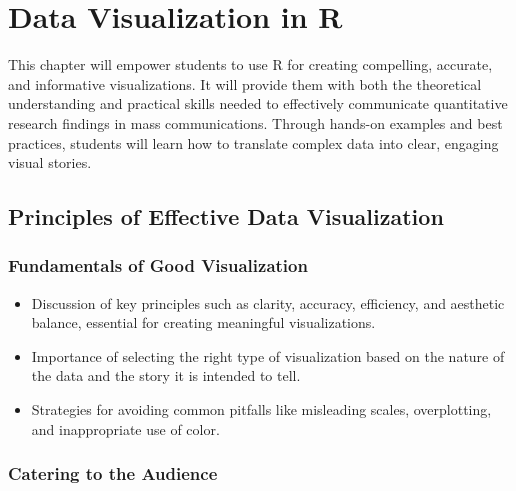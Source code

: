 \documentclass[
]{book}
\begin{document}
\hypertarget{data-visualization-in-r}{%
\chapter*{Data Visualization in R}\label{data-visualization-in-r}}

This chapter will empower students to use R for creating compelling, accurate, and informative visualizations. It will provide them with both the theoretical understanding and practical skills needed to effectively communicate quantitative research findings in mass communications. Through hands-on examples and best practices, students will learn how to translate complex data into clear, engaging visual stories.

\hypertarget{principles-of-effective-data-visualization}{%
\section*{Principles of Effective Data Visualization}\label{principles-of-effective-data-visualization}}

\hypertarget{fundamentals-of-good-visualization}{%
\subsection*{Fundamentals of Good Visualization}\label{fundamentals-of-good-visualization}}

\begin{itemize}
\item
  Discussion of key principles such as clarity, accuracy, efficiency, and aesthetic balance, essential for creating meaningful visualizations.
\item
  Importance of selecting the right type of visualization based on the nature of the data and the story it is intended to tell.
\item
  Strategies for avoiding common pitfalls like misleading scales, overplotting, and inappropriate use of color.
\end{itemize}

\hypertarget{catering-to-the-audience}{%
\subsection*{Catering to the Audience}\label{catering-to-the-audience}}
\end{document}
